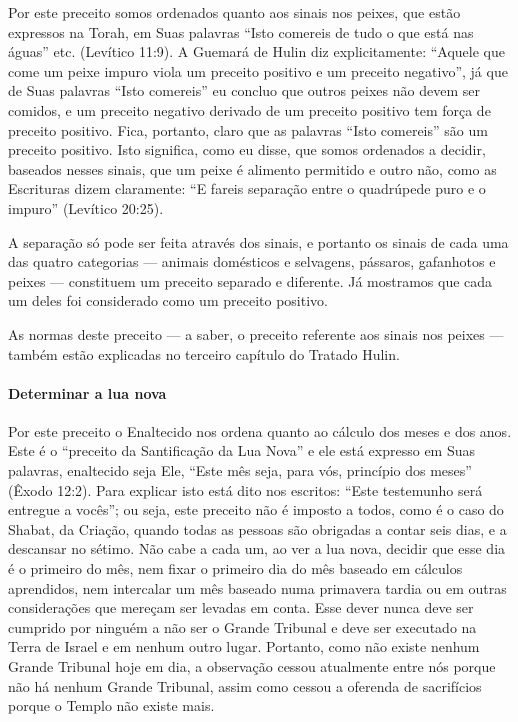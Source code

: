 Por este preceito somos ordenados quanto aos sinais nos peixes, que
estão expressos na Torah, em Suas palavras ``Isto comereis de tudo o que
está nas águas'' etc. (Levítico 11:9). A Guemará de Hulin diz
explicitamente: ``Aquele que come um peixe impuro viola um preceito
positivo e um preceito negativo'', já que de Suas palavras ``Isto
comereis'' eu concluo que outros peixes não devem ser comidos, e um
preceito negativo derivado de um preceito positivo tem força de preceito
positivo. Fica, portanto, claro que as palavras ``Isto comereis'' são
um preceito positivo. Isto significa, como eu disse, que somos
ordenados a decidir, baseados nesses sinais, que um peixe é alimento
permitido e outro não, como as Escrituras dizem claramente: ``E fareis
separação entre o quadrúpede puro e o impuro'' (Levítico 20:25).

A separação só pode ser feita através dos sinais, e portanto os sinais
de cada uma das quatro categorias --- animais domésticos e selvagens,
pássaros, gafanhotos e peixes --- constituem um preceito separado e
diferente. Já mostramos que cada um deles foi considerado como um
preceito positivo.

As normas deste preceito --- a saber, o preceito referente aos sinais
nos peixes --- também estão explicadas no terceiro capítulo do Tratado
Hulin.

\paragraph{Determinar a lua nova}

Por este preceito o Enaltecido nos ordena quanto ao cálculo dos meses e
dos anos. Este é o ``preceito da Santificação da Lua Nova'' e ele está
expresso em Suas palavras, enaltecido seja Ele, ``Este mês seja, para
vós, princípio dos meses'' (Êxodo 12:2). Para explicar isto está dito
nos escritos: ``Este testemunho será entregue a vocês''; ou seja, este preceito não é imposto a
todos, como é o caso do Shabat, da Criação, quando todas as pessoas são
obrigadas a contar seis dias, e a descansar no sétimo. Não cabe a cada
um, ao ver a lua nova, decidir que esse dia é o primeiro do mês, nem
fixar o primeiro dia do mês baseado em cálculos aprendidos, nem
intercalar um mês baseado numa primavera tardia ou em outras
considerações que mereçam ser levadas em conta. Esse dever nunca deve
ser cumprido por ninguém a não ser o Grande Tribunal e deve ser
executado na Terra de Israel e em nenhum outro lugar. Portanto, como
não existe nenhum Grande Tribunal hoje em dia, a observação cessou
atualmente entre nós porque não há nenhum Grande Tribunal, assim como
cessou a oferenda de sacrifícios porque o Templo não existe mais.

